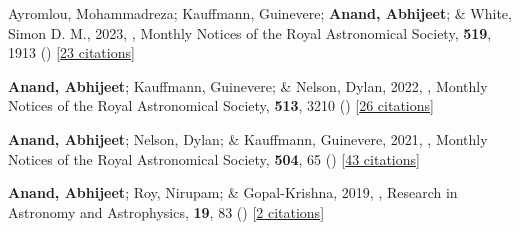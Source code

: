 \item[{\color{numcolor}\scriptsize4}] Ayromlou, Mohammadreza; Kauffmann, Guinevere; \textbf{Anand, Abhijeet}; \& White, Simon D. M., 2023, , Monthly Notices of the Royal Astronomical Society, \textbf{519}, 1913 () [\href{https://ui.adsabs.harvard.edu/abs/2023MNRAS.519.1913A}{23 citations}]

\item[{\color{numcolor}\scriptsize3}] \textbf{Anand, Abhijeet}; Kauffmann, Guinevere; \& Nelson, Dylan, 2022, , Monthly Notices of the Royal Astronomical Society, \textbf{513}, 3210 () [\href{https://ui.adsabs.harvard.edu/abs/2022MNRAS.513.3210A}{26 citations}]

\item[{\color{numcolor}\scriptsize2}] \textbf{Anand, Abhijeet}; Nelson, Dylan; \& Kauffmann, Guinevere, 2021, , Monthly Notices of the Royal Astronomical Society, \textbf{504}, 65 () [\href{https://ui.adsabs.harvard.edu/abs/2021MNRAS.504...65A}{43 citations}]

\item[{\color{numcolor}\scriptsize1}] \textbf{Anand, Abhijeet}; Roy, Nirupam; \& Gopal-Krishna, 2019, , Research in Astronomy and Astrophysics, \textbf{19}, 83 () [\href{https://ui.adsabs.harvard.edu/abs/2019RAA....19...83A}{2 citations}]